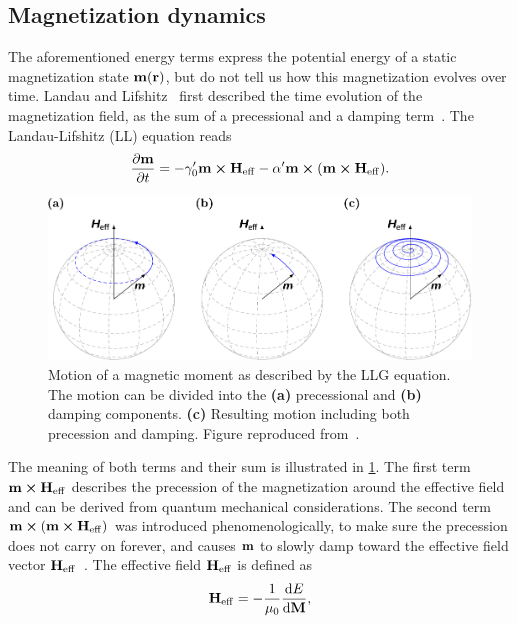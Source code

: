 \documentclass[11pt,a4paper,english,twoside]{article}
\begin{document}
\subsection{Magnetization dynamics}
The aforementioned energy terms express the potential energy of a static magnetization state $\vb{m}(\vb{r})$, but do not tell us how this magnetization evolves over time. Landau and Lifshitz~\cite{lifdau} first described the time evolution of the magnetization field, as the sum of a precessional and a damping term~\cite{NML_Carlton, abert2013discrete, phd_leliaert}. The Landau-Lifshitz (LL) equation reads
\begin{equation}
    \frac{\partial \vb{m}}{\partial t} = - \gamma_0' \vb{m} \cross \vb{H_\mathrm{eff}} - \alpha' \vb{m} \cross (\vb{m} \cross \vb{H_\mathrm{eff}}) \mathrm{.}
    \label{eq:LL}
\end{equation}
\begin{figure}
    \centering
    \includegraphics[width=0.8\columnwidth]{Figures/Introduction/abert2013discrete - Figure 2.2.pdf}
    \caption{Motion of a magnetic moment as described by the LLG equation. The motion can be divided into the \textbf{(a)} precessional and \textbf{(b)} damping components. \textbf{(c)} Resulting motion including both precession and damping. Figure reproduced from~\cite{abert2013discrete}.}
    \label{fig:LLG_motion_Heff}
\end{figure}
\par The meaning of both terms and their sum is illustrated in \cref{fig:LLG_motion_Heff}. The first term $\vb{m} \cross \vb{H_\mathrm{eff}}$ describes the precession of the magnetization around the effective field and can be derived from quantum mechanical considerations. The second term $\vb{m} \cross (\vb{m} \cross \vb{H_\mathrm{eff}})$ was introduced phenomenologically, to make sure the precession does not carry on forever, and causes $\vb{m}$ to slowly damp toward the effective field vector $\vb{H_\mathrm{eff}}$~\cite{NML_Carlton}. The effective field $\vb{H_\mathrm{eff}}$ is defined as
\begin{equation}
	\vb{H_\mathrm{eff}} = - \frac{1}{\mu_0} \frac{\mathrm{d} E}{\mathrm{d} \vb{M}} \mathrm{,}
	\label{eq:H_eff}
\end{equation}
\end{document}
